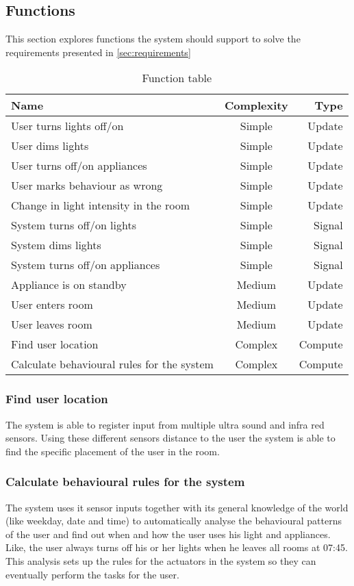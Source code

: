 \subsection{Functions}

This section explores functions the system should support to solve the requirements presented in \cref{sec:requirements}


\label{subsec:Functions}
\begin{table}[hbtp]
\centering
\begin{tabular}{lcr}
\toprule
\textbf{Name}																& \textbf{Complexity}	& \textbf{Type} \\
\midrule
User turns lights off/on				& Simple	& Update  \\
User dims lights					& Simple	& Update  \\
User turns off/on appliances			& Simple	& Update  \\
User marks behaviour as wrong			& Simple	& Update  \\
Change in light intensity in the room		& Simple	& Update  \\
System turns off/on lights			& Simple	& Signal  \\
System dims lights				& Simple	& Signal  \\
System turns off/on appliances			& Simple	& Signal  \\
Appliance is on standby				& Medium	& Update  \\
User enters room				& Medium	& Update  \\
User leaves room				& Medium	& Update  \\
Find user location			& Complex	& Compute \\
Calculate behavioural rules for the system	& Complex	& Compute \\
\bottomrule
\end{tabular}
\caption{Function table}
\label{table:functionlist}
\end{table}

\subsubsection{Find user location}
The system is able to register input from multiple ultra sound and infra red sensors. Using these different sensors distance to the user the system is able to find the specific placement of the user in the room.

\subsubsection{Calculate behavioural rules for the system}
The system uses it sensor inputs together with its general knowledge of the world (like weekday, date and time) to automatically analyse the behavioural patterns of the user and find out when and how the user uses his light and appliances. Like, the user always turns off his or her lights when he leaves all rooms at 07:45. This analysis sets up the rules for the actuators in the system so they can eventually perform the tasks for the user.
